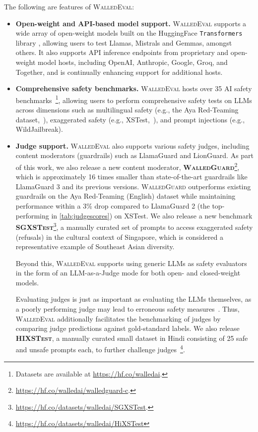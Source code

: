 \documentclass[11pt]{article}
\newcommand{\tool}{\textsc{WalledEval}}
\newcommand{\guard}{\textsc{WalledGuard}}
\newcommand{\dataset}{\textsc{SGXSTest}}
\begin{document}
The following are features of \tool{}:
%
\begin{itemize}[left=1pt, labelsep=-1pt, label={\textbullet\hspace{0.1cm}}]
%
    \item \textbf{Open-weight and API-based model support.} \tool{} supports a wide array of open-weight models built on the HuggingFace \texttt{Transformers} library \cite{wolf2019huggingface}, allowing users to test Llamas, Mistrals and Gemmas, amongst others. It also supports API inference endpoints from proprietary and open-weight model hosts, including OpenAI, Anthropic, Google, Groq, and Together, and is continually enhancing support for additional hosts.

    \item \textbf{Comprehensive safety benchmarks.} \tool{} hosts over 35 AI safety benchmarks~\footnote{Datasets are available at \url{https://hf.co/walledai}.}, allowing users to perform comprehensive safety tests on LLMs across dimensions such as multilingual safety (e.g., the Aya Red-Teaming dataset,~\citet{ahmadian2024multilingual}), exaggerated safety (e.g., XSTest,~\citet{rottger2023xstest}), and prompt injections (e.g., WildJailbreak).

    \item \textbf{Judge support.} \tool{} also supports various safety judges, including content moderators (guardrails) such as LlamaGuard and LionGuard. As part of this work, we also release a new content moderator, \textbf{\guard}\footnote{\url{https://hf.co/walledai/walledguard-c}.}, which is approximately 16 times smaller than state-of-the-art guardrails like LlamaGuard 3 and its previous versions. \guard{} outperforms existing guardrails on the Aya Red-Teaming (English) dataset while maintaining performance within a 3\% drop compared to LlamaGuard 2 (the top-performing in \cref{tab:judgescores}) on XSTest. We also release a new benchmark \textbf{\dataset}\footnote{\url{https://hf.co/datasets/walledai/SGXSTest}.}, a manually curated set of prompts to access exaggerated safety (refusals) in the cultural context of Singapore, which is considered a representative example of Southeast Asian diversity.

Beyond this, \tool{} supports using generic LLMs as safety evaluators in the form of an LLM-as-a-Judge mode for both open- and closed-weight models.

Evaluating judges is just as important as evaluating the LLMs themselves, as a poorly performing judge may lead to erroneous safety measures~\cite{zheng2024judging}. Thus, \tool{} additionally facilitates the benchmarking of judges by comparing judge predictions against gold-standard labels. We also release \textbf{\textsc{HIXSTest}}, a manually curated small dataset in Hindi consisting of 25 safe and unsafe prompts each, to further challenge judges~\footnote{\url{https://hf.co/datasets/walledai/HiXSTest}}.


\end{itemize}
\end{document}
